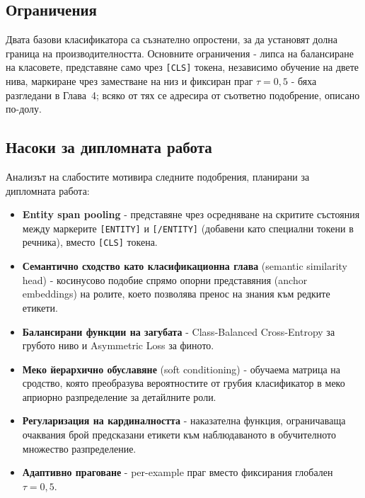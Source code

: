\documentclass[12pt,a4paper]{report}
\begin{document}
\subsection*{Ограничения}

Двата базови класификатора са съзнателно опростени, за да установят долна граница на производителността. Основните ограничения - липса на балансиране на класовете, представяне само чрез \texttt{[CLS]} токена, независимо обучение на двете нива, маркиране чрез заместване на низ и фиксиран праг $\tau=0{,}5$ - бяха разгледани в Глава~4; всяко от тях се адресира от съответно подобрение, описано по-долу.

\subsection*{Насоки за дипломната работа}

Анализът на слабостите мотивира следните подобрения, планирани за дипломната работа:

\begin{itemize}
  \item \textbf{Entity span pooling} - представяне чрез осредняване на скритите състояния между маркерите \texttt{[ENTITY]} и \texttt{[/ENTITY]} (добавени като специални токени в речника), вместо \texttt{[CLS]} токена.

  \item \textbf{Семантично сходство като класификационна глава} (semantic similarity head) - косинусово подобие спрямо опорни представяния (anchor embeddings) на ролите, което позволява пренос на знания към редките етикети.

  \item \textbf{Балансирани функции на загубата} - Class-Balanced Cross-Entropy \cite{cui2019classbalanced} за грубото ниво и Asymmetric Loss \cite{benbaruch2021asl} за финото.

  \item \textbf{Меко йерархично обуславяне} (soft conditioning) - обучаема матрица на сродство, която преобразува вероятностите от грубия класификатор в меко априорно разпределение за детайлните роли.

  \item \textbf{Регуларизация на кардиналността} - наказателна функция, ограничаваща очаквания брой предсказани етикети към наблюдаваното в обучителното множество разпределение.

  \item \textbf{Адаптивно праговане} - per-example праг вместо фиксирания глобален $\tau=0{,}5$.
\end{itemize}
\end{document}

